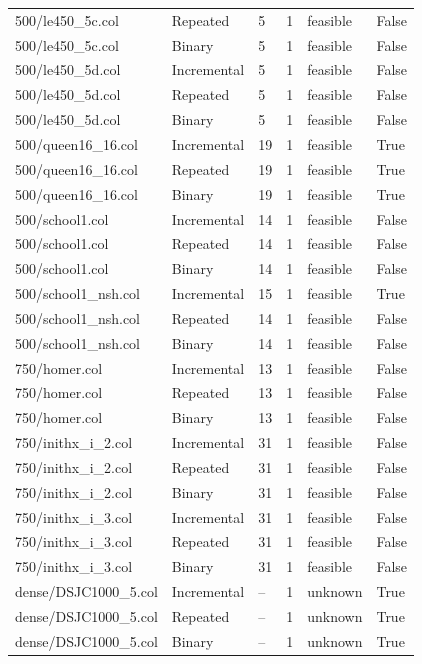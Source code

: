 \begin{table}[htbp]
\begin{tabular}{llllll}
500/le450\_5c.col & Repeated & 5 & 1 & feasible & False \\
500/le450\_5c.col & Binary & 5 & 1 & feasible & False \\
500/le450\_5d.col & Incremental & 5 & 1 & feasible & False \\
500/le450\_5d.col & Repeated & 5 & 1 & feasible & False \\
500/le450\_5d.col & Binary & 5 & 1 & feasible & False \\
500/queen16\_16.col & Incremental & 19 & 1 & feasible & True \\
500/queen16\_16.col & Repeated & 19 & 1 & feasible & True \\
500/queen16\_16.col & Binary & 19 & 1 & feasible & True \\
500/school1.col & Incremental & 14 & 1 & feasible & False \\
500/school1.col & Repeated & 14 & 1 & feasible & False \\
500/school1.col & Binary & 14 & 1 & feasible & False \\
500/school1\_nsh.col & Incremental & 15 & 1 & feasible & True \\
500/school1\_nsh.col & Repeated & 14 & 1 & feasible & False \\
500/school1\_nsh.col & Binary & 14 & 1 & feasible & False \\
750/homer.col & Incremental & 13 & 1 & feasible & False \\
750/homer.col & Repeated & 13 & 1 & feasible & False \\
750/homer.col & Binary & 13 & 1 & feasible & False \\
750/inithx\_i\_2.col & Incremental & 31 & 1 & feasible & False \\
750/inithx\_i\_2.col & Repeated & 31 & 1 & feasible & False \\
750/inithx\_i\_2.col & Binary & 31 & 1 & feasible & False \\
750/inithx\_i\_3.col & Incremental & 31 & 1 & feasible & False \\
750/inithx\_i\_3.col & Repeated & 31 & 1 & feasible & False \\
750/inithx\_i\_3.col & Binary & 31 & 1 & feasible & False \\
dense/DSJC1000\_5.col & Incremental & -- & 1 & unknown & True \\
dense/DSJC1000\_5.col & Repeated & -- & 1 & unknown & True \\
dense/DSJC1000\_5.col & Binary & -- & 1 & unknown & True \\

\end{tabular}
\end{table}
